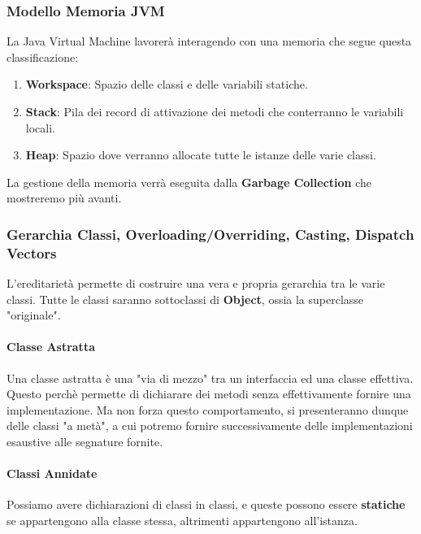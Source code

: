 \documentclass{article}
\begin{document}
\subsubsection{Modello Memoria JVM}

La Java Virtual Machine lavorerà interagendo con una memoria che segue questa classificazione:

\begin{enumerate}
    \item \textbf{Workspace}: Spazio delle classi e delle variabili statiche.
    \item \textbf{Stack}: Pila dei record di attivazione dei metodi che conterranno le variabili locali.
    \item \textbf{Heap}: Spazio dove verranno allocate tutte le istanze delle varie classi.
\end{enumerate}

La gestione della memoria verrà eseguita dalla \textbf{Garbage Collection} che mostreremo più avanti.

\subsubsection{Gerarchia Classi, Overloading/Overriding, Casting, Dispatch Vectors}

L'ereditarietà permette di costruire una vera e propria gerarchia tra le varie classi. Tutte le classi saranno sottoclassi di \textbf{Object}, ossia la superclasse "originale".

\paragraph{Classe Astratta} Una classe astratta è una "via di mezzo" tra un interfaccia ed una classe effettiva. Questo perchè permette di dichiarare dei metodi senza effettivamente fornire una implementazione. Ma non forza questo comportamento, si presenteranno dunque delle classi "a metà", a cui potremo fornire successivamente delle implementazioni esaustive alle segnature fornite.

\paragraph{Classi Annidate} Possiamo avere dichiarazioni di classi in classi, e queste possono essere \textbf{statiche} se appartengono alla classe stessa, altrimenti appartengono all'istanza.

\vspace*{6px}
\end{document}
